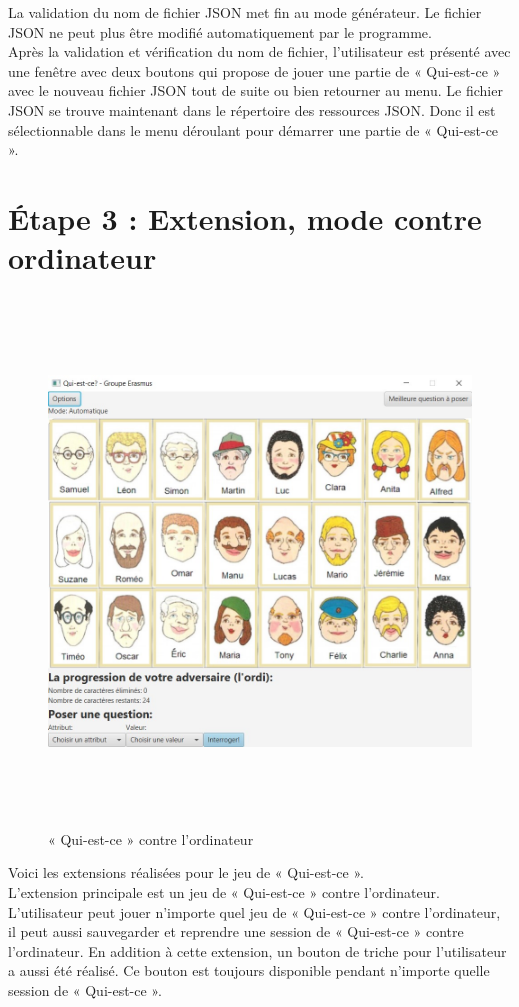 \documentclass[a4paper]{article}
\begin{document}
La validation du nom de fichier JSON met fin au mode générateur. Le fichier JSON ne peut plus être modifié automatiquement par le programme.\\
Après la validation et vérification du nom de fichier, l’utilisateur est présenté avec une fenêtre avec deux boutons qui propose de jouer une partie de « Qui-est-ce » avec le nouveau fichier JSON tout de suite ou bien retourner au menu. Le fichier JSON se trouve maintenant dans le répertoire des ressources JSON. Donc il est sélectionnable dans le menu déroulant pour démarrer une partie de « Qui-est-ce ».
\newpage


\section{Étape 3 : Extension, mode contre ordinateur}

\begin{figure}[ht]
    \centering
    \includegraphics[width= 16cm, height=14cm]{game vs bot.jpg}
    \caption{« Qui-est-ce » contre l'ordinateur}
\end{figure}


Voici les extensions réalisées pour le jeu de « Qui-est-ce ».\\
L’extension principale est un jeu de « Qui-est-ce » contre l’ordinateur. L’utilisateur peut jouer n’importe quel jeu de « Qui-est-ce » contre l’ordinateur, il peut aussi sauvegarder et reprendre une session de « Qui-est-ce » contre l’ordinateur. En addition à cette extension, un bouton de triche pour l’utilisateur a aussi été réalisé. Ce bouton est toujours disponible pendant n’importe quelle session de « Qui-est-ce ».\\
\end{document}
